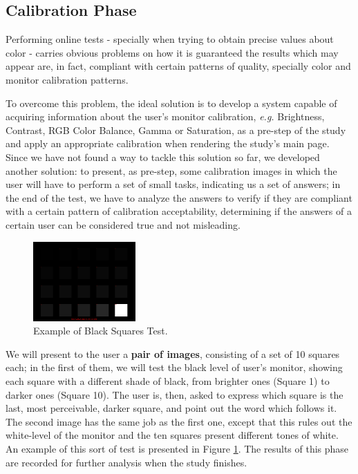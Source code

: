 \subsection{Calibration Phase}
\label{sec:researchprop_colordeficiency}
%
Performing online tests - specially when trying to obtain precise values about color - carries obvious problems on how it is guaranteed the results which may appear are, in fact, compliant with certain patterns of
quality, specially color and monitor calibration patterns. \par
%
To overcome this problem, the ideal solution is to develop a system capable of acquiring information about the user's monitor calibration, \emph{e.g.} Brightness, Contrast, RGB Color Balance, Gamma or Saturation, as a pre-step of the study and apply an appropriate calibration when rendering the study's main page. Since we have not found a way to tackle this solution so far, we developed another solution: to present, as pre-step, some calibration images in which the user will have to perform a set of small tasks, indicating us a set of answers; in the end of the test, we have to analyze the answers to verify if they are compliant with a certain pattern of calibration acceptability, determining if the answers of a certain user can be considered true and not misleading. \par
%
\begin{figure}[!ht]
	\centering
  \includegraphics[width=0.35\textwidth]{images/blacktest_example.png}
  \caption[Black Squares Test]{Example of Black Squares Test.\protect\footnotemark{}}
  \label{fig:blacktest_example}
\end{figure}
%
We will present to the user a \textbf{pair of images}, consisting of a set of 10 squares each; in the first of them, we will test the black level of user's monitor, showing each square with a different shade of black, from brighter ones (Square 1) to darker ones (Square 10). The user is, then, asked to express which square is the last, most perceivable, darker square, and point out the word which follows it. The second image has the same job as the first one, except that this rules out the white-level of the monitor and the ten squares present different tones of white. An example of this sort of test is presented in Figure \ref{fig:blacktest_example}. The results of this phase are recorded for further analysis when the study finishes. \par
